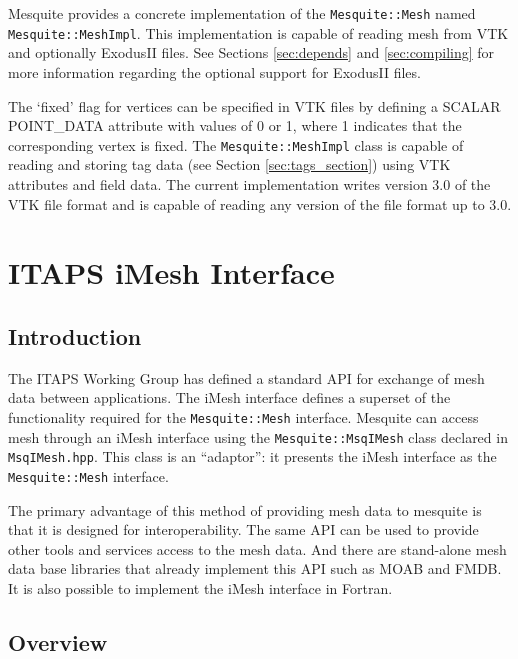 Mesquite provides a concrete implementation of the \texttt{Mesquite::Mesh} named
\texttt{Mesquite::MeshImpl}.  This implementation is capable of reading mesh from
VTK\cite{VTKbook, VTKuml} and optionally ExodusII files. See Sections 
\ref{sec:depends} and \ref{sec:compiling} for more 
information regarding the optional support for ExodusII files.

The `fixed' flag for vertices can be specified in VTK files by defining a
SCALAR POINT\_DATA attribute with values of 0 or 1, where 1 indicates that the
corresponding vertex is fixed.  The \texttt{Mesquite::MeshImpl} class is capable
of reading and storing tag data (see Section \ref{sec:tags_section}) using VTK attributes and
field data.  The current implementation writes version 3.0 of the VTK file format
and is capable of reading any version of the file format up to 3.0.  


\section{ITAPS iMesh Interface}

\subsection{Introduction}

The ITAPS Working Group has defined a standard API for exchange of mesh data between applications.  The iMesh interface\cite{imesh} defines a superset of the functionality required for the \texttt{Mesquite::Mesh} interface.  Mesquite can access mesh through an iMesh interface using the \texttt{Mesquite::MsqIMesh} class declared in \texttt{MsqIMesh.hpp}.  This class is an ``adaptor'':  it presents the iMesh interface as the \texttt{Mesquite::Mesh} interface.  

The primary advantage of this method of providing mesh data to mesquite is that it is designed for interoperability.  The same API can be used to provide other tools and services access to the mesh data.  And there are stand-alone mesh data base libraries that already implement this API such as MOAB\cite{MOAB-webpage} and FMDB\cite{FMDB-webpage}.  It is also possible to implement the iMesh interface in Fortran.

\subsection{Overview}

